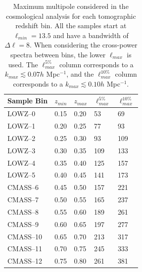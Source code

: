 \begin{table}
\centering
\caption[Maximum multipole considered in the cosmological analysis for each tomographic redshift bin.]{Maximum multipole considered in the cosmological analysis for each tomographic redshift bin. All the samples start at $\ell_{min} = 13.5$ and have a bandwidth of $\Delta\ell = 8$. When considering the cross-power spectra between bins, the lower $\ell_{max}$ is used. The $\ell_{max}^{5\%}$ column corresponds to a $k_{max}  \lesssim 0.07 h$ Mpc$^{-1}$, and the $\ell_{max}^{10\%}$ column corresponds to a  $k_{max}  \lesssim 0.10 h$ Mpc$^{-1}$.}
\label{Tb:EllCuts}
\begin{tabular}{lllll}
\hline
\hline
Sample Bin & $z_{min}$ & $z_{max}$ & $\ell_{max}^{5\%}$ & $\ell_{max}^{10\%}$\\
\hline
\hline
LOWZ--0  & 0.15      & 0.20      & 53	&	69 \\
LOWZ--1  & 0.20      & 0.25      & 77	&	93 \\
LOWZ--2  & 0.25      & 0.30      & 93	&	109\\
LOWZ--3  & 0.30      & 0.35      & 109	&	133\\
LOWZ--4  & 0.35      & 0.40      & 125	&	157\\
LOWZ--5  & 0.40      & 0.45      & 141	&	173\\
CMASS--6 & 0.45      & 0.50      & 157	&	221\\
CMASS--7 & 0.50      & 0.55      & 165	&	237\\
CMASS--8 & 0.55      & 0.60      & 189	&	261\\
CMASS--9 & 0.60      & 0.65      & 197	&	277\\
CMASS--10 & 0.65      & 0.70      & 213	&	317\\
CMASS--11 & 0.70      & 0.75      & 245	&	333\\
CMASS--12 & 0.75      & 0.80      & 261	&	381\\
\hline
\hline
\end{tabular}
\end{table}

